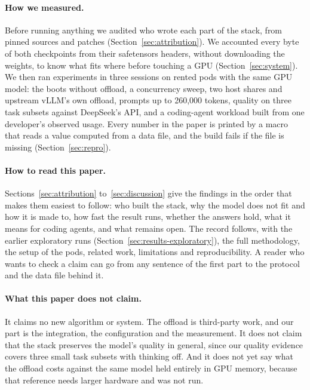 \paragraph{How we measured.}
Before running anything we audited who wrote each part of the stack, from pinned sources and patches
(Section~\ref{sec:attribution}). We accounted every byte of both checkpoints from their safetensors headers, without
downloading the weights, to know what fits where before touching a GPU (Section~\ref{sec:system}). We then ran
experiments in three sessions on rented pods with the same GPU model: the boots without offload, a concurrency sweep,
two host shares and upstream vLLM's own offload, prompts up to 260,000 tokens, quality on three task subsets against
DeepSeek's API, and a coding-agent workload built from one developer's observed usage. Every number in the paper is
printed by a macro that reads a value computed from a data file, and the build fails if the file is missing
(Section~\ref{sec:repro}).

\paragraph{How to read this paper.}
Sections~\ref{sec:attribution} to~\ref{sec:discussion} give the findings in the order that makes them easiest to
follow: who built the stack, why the model does not fit and how it is made to, how fast the result runs, whether the
answers hold, what it means for coding agents, and what remains open. The record follows, with the earlier
exploratory runs (Section~\ref{sec:results-exploratory}), the full methodology, the setup of the pods, related work,
limitations and reproducibility. A reader who wants to check a claim can go from any sentence of the first part to
the protocol and the data file behind it.

\paragraph{What this paper does not claim.}
It claims no new algorithm or system. The offload is third-party work, and our part is the integration, the
configuration and the measurement. It does not claim that the stack preserves the model's quality in general, since
our quality evidence covers three small task subsets with thinking off. And it does not yet say what the offload costs
against the same model held entirely in GPU memory, because that reference needs larger hardware and was not run.

